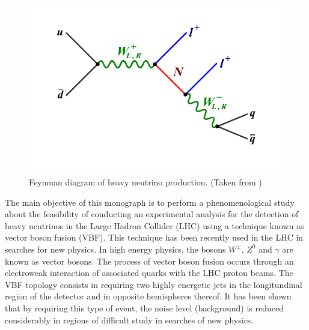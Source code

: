\begin{figure}[H]
\centering
\includegraphics[width=\linewidth]{Figures/Feynman_W.png}
\caption{Feynman diagram of heavy neutrino production. (Taken from \cite{CMS ATLAS})}
\label{fig: W}
\end{figure}

The main objective of this monograph is to perform a phenomenological study about the feasibility of conducting an experimental analysis for the detection of heavy neutrinos in the Large Hadron Collider (LHC) using a technique known as vector boson fusion (VBF). This technique has been recently used in the LHC \cite{VBF Search} in searches for new physics. In high energy physics, the bosons $W^{\pm}$, $Z^{0}$ and $\gamma$ are known as vector bosons. The process of vector boson fusion occurs through an electroweak interaction of associated quarks with the LHC proton beams. The VBF topology consists in requiring two highly energetic jets in the longitundinal region of the detector and in opposite hemispheres thereof. It has been shown that by requiring this type of event, the noise level (background) is reduced considerably in regions of difficult study in searches of new physics.


